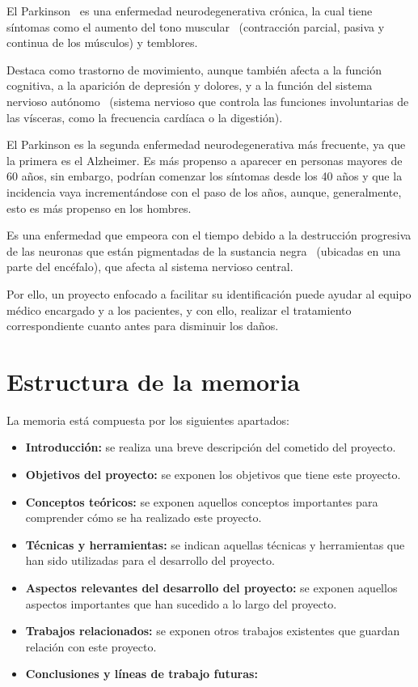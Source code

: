 El Parkinson~\cite{parkinson} es una enfermedad neurodegenerativa crónica, la cual tiene síntomas como el aumento del tono muscular~\cite{tonomuscular} (contracción parcial, pasiva y continua de los músculos) y temblores.

Destaca como trastorno de movimiento, aunque también afecta a la función cognitiva, a la aparición de depresión y dolores, y a la función del sistema nervioso autónomo~\cite{sistnervautonomo} (sistema nervioso que controla las funciones involuntarias de las vísceras, como la frecuencia cardíaca o la digestión).

El Parkinson es la segunda enfermedad neurodegenerativa más frecuente, ya que la primera es el Alzheimer. Es más propenso a aparecer en personas mayores de 60 años, sin embargo, podrían comenzar los síntomas desde los 40 años y que la incidencia vaya incrementándose con el paso de los años, aunque, generalmente, esto es más propenso en los hombres.

Es una enfermedad que empeora con el tiempo debido a la destrucción progresiva de las neuronas que están pigmentadas de la sustancia negra~\cite{sustancianegra} (ubicadas en una parte del encéfalo), que afecta al sistema nervioso central.

Por ello, un proyecto enfocado a facilitar su identificación puede ayudar al equipo médico encargado y a los pacientes, y con ello, realizar el tratamiento correspondiente cuanto antes para disminuir los daños.

\section{Estructura de la memoria}
La memoria está compuesta por los siguientes apartados:
\begin{itemize}
	\item \textbf{Introducción:} se realiza una breve descripción del cometido del proyecto.
	\item \textbf{Objetivos del proyecto:} se exponen los objetivos que tiene este proyecto.
	\item \textbf{Conceptos teóricos:} se exponen aquellos conceptos importantes para comprender cómo se ha realizado este proyecto.
	\item \textbf{Técnicas y herramientas:} se indican aquellas técnicas y herramientas que han sido utilizadas para el desarrollo del proyecto.
	\item \textbf{Aspectos relevantes del desarrollo del proyecto:} se exponen aquellos aspectos importantes que han sucedido a lo largo del proyecto.
	\item \textbf{Trabajos relacionados:} se exponen otros trabajos existentes que guardan relación con este proyecto.
	\item \textbf{Conclusiones y líneas de trabajo futuras:}
\end{itemize}

